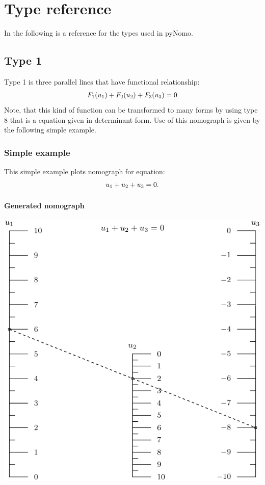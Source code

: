 \documentclass[a4paper,11pt,english]{sphinxmanual}
\begin{document}
\chapter{Type reference}
\label{types/types:type-reference}\label{types/types::doc}
In the following is a reference for the types used in pyNomo.


\section{Type 1}
\label{types/types:type1-ref}\label{types/types:type-1}
Type 1 is three parallel lines that have functional relationship:
\begin{gather}
\begin{split}F_1(u_1)+F_2(u_2)+F_3(u_3)=0\end{split}\notag
\end{gather}
Note, that this kind of function can be transformed to many forms by using type 8 that
is a equation given in determinant form. Use of this nomograph is given by the following
simple example.


\subsection{Simple example}
\label{types/types:simple-example}
This simple example plots nomograph for equation:
\begin{gather}
\begin{split}u_1 + u_2 + u_3 = 0.\end{split}\notag
\end{gather}

\subsubsection{Generated nomograph}
\label{types/types:generated-nomograph}
\includegraphics{ex_type1_nomo_1.pdf}
\end{document}
